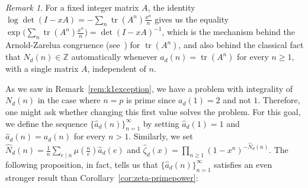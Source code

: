 \documentclass{article}
\theoremstyle{plain}
\theoremstyle{definition}
\theoremstyle{remark}
\newtheorem{remark}[theorem]{Remark}
\newcommand{\Z}{\mathbb{Z}}
\DeclareMathOperator{\tr}{tr}
\begin{document}
\begin{remark}\label{rem:Arnold}
For a fixed integer matrix $A$, the identity $\log\det(I-xA)=-\sum_n\tr(A^n)\frac{x^n}{n}$ gives us the equality $\exp\big(\sum_n\tr(A^n)\frac{x^n}{n}\big)=\det(I-xA)^{-1}$, which is the mechanism behind the Arnold-Zarelua congruence (see~\cite{Arnold2006,Zarelua2006,Zarelua2008}) for $\tr(A^n)$, and also behind the classical fact that $N_d(n)\in\Z$ automatically whenever $a_d(n)=\tr(A^n)$ for every $n\ge1$, with a single matrix $A$, independent of $n$.%
\end{remark}


As we saw in Remark~\ref{rem:k1exception}, we have a problem with integrality of $N_d(n)$ in the case where $n=p$ is prime since $a_d(1)=2$ and not $1$. Therefore, one might ask whether changing this first value solves the problem. For this goal, we define the sequence $\{\widehat a_d(n)\}_{n=1}^\infty$ by setting $\widehat a_d(1)=1$ and $\widehat a_d(n)=a_d(n)$ for every $n>1$. Similarly, we set $\widehat N_d(n)=\frac1n\sum_{e\mid n}\mu(\frac{n}{e})\widehat a_d(e)$ and $\widehat\zeta_d(x) =
\prod_{n\ge1}(1-x^n)^{-\widehat N_d(n)}$. The following proposition, in fact,  tells us that $\{\widehat a_d(n)\}_{n=1}^\infty$ satisfies an even stronger result than Corollary~\ref{cor:zeta-primepower}:
\end{document}
